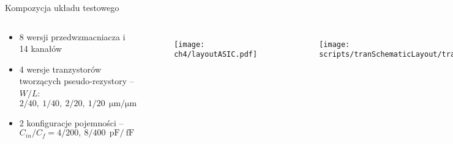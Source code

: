 \begin{frame}{Kompozycja układu testowego}
    \begin{columns}

    \vspace{-0.5em}

    \begin{block}{}
        {\renewcommand\normalsize{\small}%
        \normalsize
        \begin{itemize}
            \item 8 wersji przedwzmacniacza i 14 kanałów
            \item 4 wersje tranzystorów tworzących pseudo-rezystory  --  $W/L$: $2/40,\ 1/40,\ 2/20,\ 1/20\ \SI{}{\micro\metre / \micro\metre}$
            \item 2 konfiguracje pojemności -- $C_{in}/C_f = 4/200,\ 8/400\ \SI{}{\pico\farad}/\SI{}{\femto\farad}$
        \end{itemize}
        }
    \end{block}
    \vspace{-1em}

    \begin{figure}[H]
        \centering
        \texttt{[image: ch4/layoutASIC.pdf]} 
    \end{figure}   

    \vspace{-2em}


    \begin{figure}[H]
        \centering
        \texttt{[image: scripts/tranSchematicLayout/tranSchematicLayout.pdf]}  
    \end{figure}
    \vspace{-5mm} %
    \begin{figure}[H]
        \centering
        \texttt{[image: scripts/noiseContribution/noiseContributionOut.pdf]}  
    \end{figure}

    \end{columns}   
  
\end{frame}




